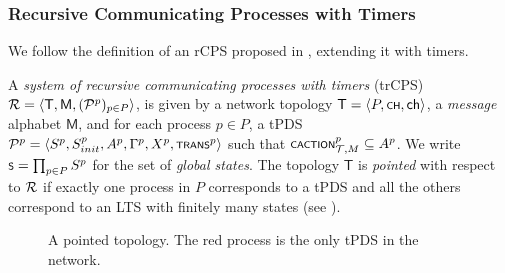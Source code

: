 \subsubsection{Recursive Communicating Processes with Timers}
We follow the definition of an rCPS proposed in \cite[Definition 1.7]{heussner2012reachability}, extending it with timers.

A \emph{system of recursive communicating processes with timers} (trCPS) $\cal R = \tup{\mathsf T,\mathsf M, (\cal P^p)_{p \in P}}$, is given by a network topology $\mathsf T = \tup{P, \scrsf{ch}, \ch}$, a \emph{message} alphabet $\mathsf M$, and for each process $p \in P$, a tPDS $\cal P^p = \tup{S^p,S_{init}^p,A^p,\Gamma^p,X^p,\trans^p}$ such that $\scrsf{caction}^p_{\cal T, M} \subseteq A^p$. We write $\scrsf{s} = \prod_{p \in P} S^p$ for the set of \emph{global states}. The topology $\mathsf T$ is \emph{pointed} with respect to $\cal R$ if exactly one process in $P$ corresponds to a tPDS and all the others correspond to an LTS with finitely many states (see ).

\begin{figure}
	\centering
	\captionsetup{skip=5pt}
	\caption{\label{fig:pointed-topo}A pointed topology. The red  process is the only tPDS in the network.}
\end{figure}

